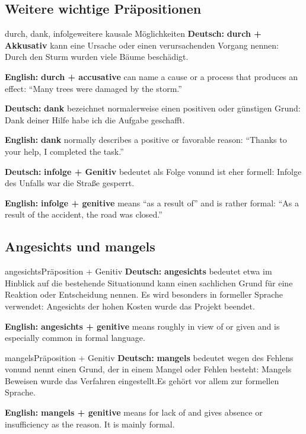 \documentclass[a4paper,11pt]{article}
\newcommand{\GermanText}[1]{\textbf{Deutsch: }#1\par}
\newcommand{\EnglishText}[1]{{\small\color{SoftGray}\textbf{English: }#1\par}}
\begin{document}
        \subsection{Weitere wichtige Präpositionen}

            \begin{grammarentry}{durch, dank, infolge}{weitere kausale Möglichkeiten}
                \GermanText{\textbf{durch + Akkusativ} kann eine Ursache oder einen verursachenden Vorgang nennen: \glqq Durch den Sturm wurden viele Bäume beschädigt.\grqq}
                \EnglishText{\textbf{durch + accusative} can name a cause or a process that produces an effect: ``Many trees were damaged by the storm.''}

                \GermanText{\textbf{dank} bezeichnet normalerweise einen positiven oder günstigen Grund: \glqq Dank deiner Hilfe habe ich die Aufgabe geschafft.\grqq}
                \EnglishText{\textbf{dank} normally describes a positive or favorable reason: ``Thanks to your help, I completed the task.''}

                \GermanText{\textbf{infolge + Genitiv} bedeutet \glqq als Folge von\grqq und ist eher formell: \glqq Infolge des Unfalls war die Straße gesperrt.\grqq}
                \EnglishText{\textbf{infolge + genitive} means ``as a result of'' and is rather formal: ``As a result of the accident, the road was closed.''}
            \end{grammarentry}

        \subsection{Angesichts und mangels}

            \begin{grammarentry}{angesichts}{Präposition + Genitiv}
                \GermanText{\textbf{angesichts} bedeutet etwa \glqq im Hinblick auf die bestehende Situation\grqq und kann einen sachlichen Grund für eine Reaktion oder Entscheidung nennen. Es wird besonders in formeller Sprache verwendet: \glqq Angesichts der hohen Kosten wurde das Projekt beendet.\grqq}
                \EnglishText{\textbf{angesichts + genitive} means roughly in view of or given and is especially common in formal language.}
            \end{grammarentry}

            \begin{grammarentry}{mangels}{Präposition + Genitiv}
                \GermanText{\textbf{mangels} bedeutet \glqq wegen des Fehlens von\grqq und nennt einen Grund, der in einem Mangel oder Fehlen besteht: \glqq Mangels Beweisen wurde das Verfahren eingestellt.\grqq Es gehört vor allem zur formellen Sprache.}
                \EnglishText{\textbf{mangels + genitive} means for lack of and gives absence or insufficiency as the reason. It is mainly formal.}
            \end{grammarentry}
\end{document}
